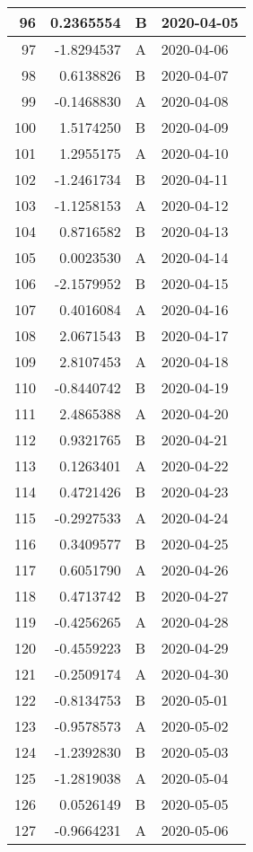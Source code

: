 \begin{tabular}{r|r|l|l}
\hline
96 & 0.2365554 & B & 2020-04-05\\
\hline
97 & -1.8294537 & A & 2020-04-06\\
\hline
98 & 0.6138826 & B & 2020-04-07\\
\hline
99 & -0.1468830 & A & 2020-04-08\\
\hline
100 & 1.5174250 & B & 2020-04-09\\
\hline
101 & 1.2955175 & A & 2020-04-10\\
\hline
102 & -1.2461734 & B & 2020-04-11\\
\hline
103 & -1.1258153 & A & 2020-04-12\\
\hline
104 & 0.8716582 & B & 2020-04-13\\
\hline
105 & 0.0023530 & A & 2020-04-14\\
\hline
106 & -2.1579952 & B & 2020-04-15\\
\hline
107 & 0.4016084 & A & 2020-04-16\\
\hline
108 & 2.0671543 & B & 2020-04-17\\
\hline
109 & 2.8107453 & A & 2020-04-18\\
\hline
110 & -0.8440742 & B & 2020-04-19\\
\hline
111 & 2.4865388 & A & 2020-04-20\\
\hline
112 & 0.9321765 & B & 2020-04-21\\
\hline
113 & 0.1263401 & A & 2020-04-22\\
\hline
114 & 0.4721426 & B & 2020-04-23\\
\hline
115 & -0.2927533 & A & 2020-04-24\\
\hline
116 & 0.3409577 & B & 2020-04-25\\
\hline
117 & 0.6051790 & A & 2020-04-26\\
\hline
118 & 0.4713742 & B & 2020-04-27\\
\hline
119 & -0.4256265 & A & 2020-04-28\\
\hline
120 & -0.4559223 & B & 2020-04-29\\
\hline
121 & -0.2509174 & A & 2020-04-30\\
\hline
122 & -0.8134753 & B & 2020-05-01\\
\hline
123 & -0.9578573 & A & 2020-05-02\\
\hline
124 & -1.2392830 & B & 2020-05-03\\
\hline
125 & -1.2819038 & A & 2020-05-04\\
\hline
126 & 0.0526149 & B & 2020-05-05\\
\hline
127 & -0.9664231 & A & 2020-05-06\\

\end{tabular}
